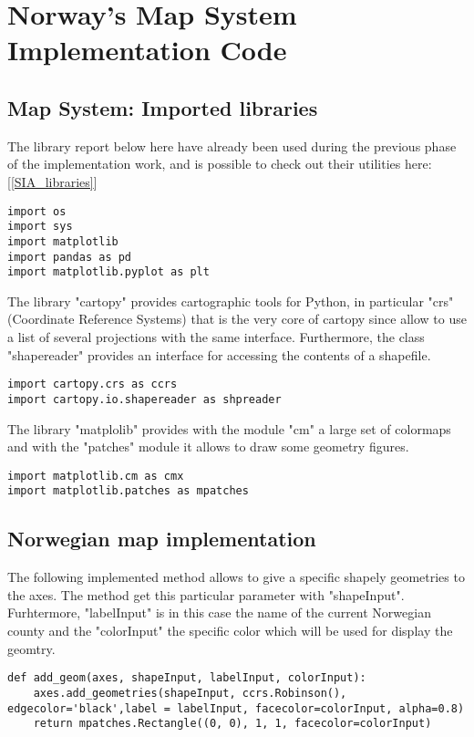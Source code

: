 \chapter{Norway's Map System Implementation Code}
\label{Map_System}
\section{Map System: Imported libraries}
\label{Map_libraries}
The library report below here have already been used during the previous phase of the implementation work, and is possible to check out their utilities here: [\ref{SIA_libraries}]
\begin{lstlisting}
import os
import sys
import matplotlib
import pandas as pd
import matplotlib.pyplot as plt
\end{lstlisting}

The library "cartopy" provides cartographic tools for Python, in particular "crs" (Coordinate Reference Systems) that is the very core of cartopy since allow to use a list of several projections with the same interface. Furthermore, the class "shapereader" provides an interface for accessing the contents of a shapefile.
\begin{lstlisting}
import cartopy.crs as ccrs
import cartopy.io.shapereader as shpreader
\end{lstlisting}

The library "matplolib" provides with the module "cm" a large set of colormaps and with the "patches" module it allows to draw some geometry figures.
\begin{lstlisting}
import matplotlib.cm as cmx
import matplotlib.patches as mpatches
\end{lstlisting}

\section{Norwegian map implementation}
\label{Map_system_implementation}
The following implemented method allows to give a specific shapely geometries to the axes. The method get this particular parameter with "shapeInput". Furhtermore, "labelInput" is in this case the name of the current Norwegian county and the "colorInput" the specific color which will be used for display the geomtry.
\begin{lstlisting}
def add_geom(axes, shapeInput, labelInput, colorInput):
	axes.add_geometries(shapeInput, ccrs.Robinson(), edgecolor='black',label = labelInput, facecolor=colorInput, alpha=0.8)
	return mpatches.Rectangle((0, 0), 1, 1, facecolor=colorInput)
\end{lstlisting}

